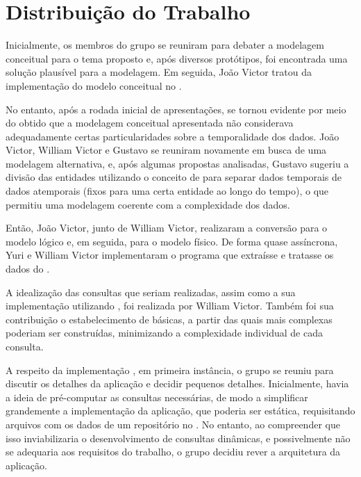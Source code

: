 \chapter{Distribuição do Trabalho}

  Inicialmente, os membros do grupo se reuniram para debater a modelagem conceitual para o tema proposto e, após diversos protótipos, foi encontrada uma solução plausível para a modelagem. Em seguida, João Victor tratou da implementação do modelo conceitual no .

  No entanto, após a rodada inicial de apresentações,
  se tornou evidente por meio do  obtido que a modelagem conceitual apresentada não considerava adequadamente certas particularidades sobre a temporalidade dos dados. João Victor, William Victor e Gustavo se reuniram novamente em busca de uma modelagem alternativa, e, após algumas propostas analisadas, Gustavo sugeriu a divisão das entidades utilizando o conceito de  para separar dados temporais de dados atemporais (fixos para uma certa entidade ao longo do tempo), o que permitiu uma modelagem coerente com a complexidade dos dados.

  Então, João Victor, junto de William Victor, realizaram a conversão para o modelo lógico e, em seguida, para o modelo físico. De forma quase assíncrona, Yuri e William Victor implementaram o programa que extraísse e tratasse os dados do
  .

  A idealização das consultas que seriam realizadas, assim como a sua implementação utilizando  , foi realizada por William Victor. Também foi sua contribuição o estabelecimento de  básicas, a partir das quais  mais complexas poderiam ser construídas, minimizando a complexidade individual de cada consulta.

  A respeito da implementação , em primeira instância, o grupo se reuniu para discutir os detalhes da aplicação e decidir pequenos detalhes. Inicialmente, havia a ideia de pré-computar as consultas necessárias, de modo a simplificar grandemente a implementação da aplicação, que poderia ser estática, requisitando arquivos  com os dados de um repositório no . No entanto, ao compreender que isso inviabilizaria o desenvolvimento de consultas dinâmicas, e possivelmente não se adequaria aos requisitos do trabalho, o grupo decidiu rever a arquitetura da aplicação.

